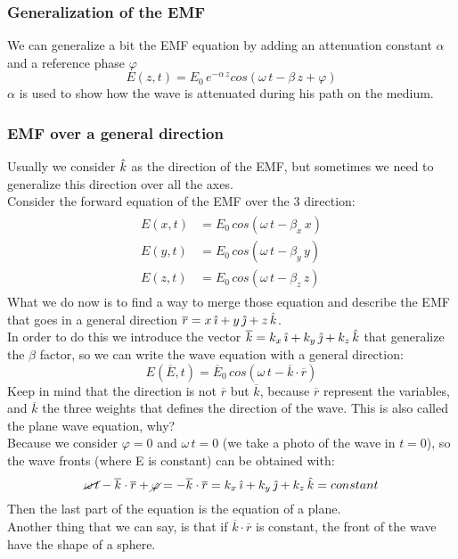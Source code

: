\subsubsection*{Generalization of the EMF}
We can generalize a bit the EMF equation by adding an attenuation constant $\alpha$ and a reference phase $\varphi$
\begin{equation}\label{eq:wave_equation_generalized}
    E(z,t)=E_0\,e^{-\alpha\,z}cos(\omega\,t-\beta\,z+\varphi)
\end{equation}
$\alpha$ is used to show how the wave is attenuated during his path on the medium.
\subsubsection*{EMF over a general direction}
Usually we consider $\hat{\mathnormal{k}}$ as the direction of the EMF, but sometimes we need to generalize this direction over all the axes.\\
Consider the forward equation of the EMF over the 3 direction:
\begin{align}
    \begin{split}
        E(x,t)&=E_0\,cos(\omega\,t-\beta_x\,x)\\[5pt]
        E(y,t)&=E_0\,cos(\omega\,t-\beta_y\,y)\\[5pt]
        E(z,t)&=E_0\,cos(\omega\,t-\beta_z\,z)
    \end{split}
\end{align}
What we do now is to find a way to merge those equation and describe the EMF that goes in a general direction $\overline{r}=x\,\hat{\imath}+y\,\hat{\jmath}+z\,\hat{\mathnormal{k}}$.\\
In order to do this we introduce the vector $\overline{k}=k_x\,\hat{\imath}+k_y\,\hat{\jmath}+k_z\,\hat{\mathnormal{k}}$ that generalize the $\beta$ factor, so we can write the wave equation with a general direction:
\begin{equation}
    E(\overline{E},t)=\overline{E}_0\,cos(\omega\,t-\overline{k}\cdot\overline{r})
\end{equation}
Keep in mind that the direction is not $\overline{r}$ but $\overline{k}$, because $\overline{r}$ represent the variables, and $\overline{k}$ the three weights that defines the direction of the wave.
This is also called the plane wave equation, why?\\
Because we consider $\varphi = 0$ and $\omega\,t=0$ (we take a photo of the wave in $t=0$), so the wave fronts (where E is constant) can be obtained with:
\begin{equation}
    \cancel{\omega\,t}-\overline{k}\cdot\overline{r}+\cancel{\varphi}=-\overline{k}\cdot\overline{r}=k_x\,\hat{\imath}+k_y\,\hat{\jmath}+k_z\,\hat{\mathnormal{k}}=constant
\end{equation}
Then the last part of the equation is the equation of a plane.\\
Another thing that we can say, is that if $\overline{k}\cdot\overline{r}$ is constant, the front of the wave have the shape of a sphere.